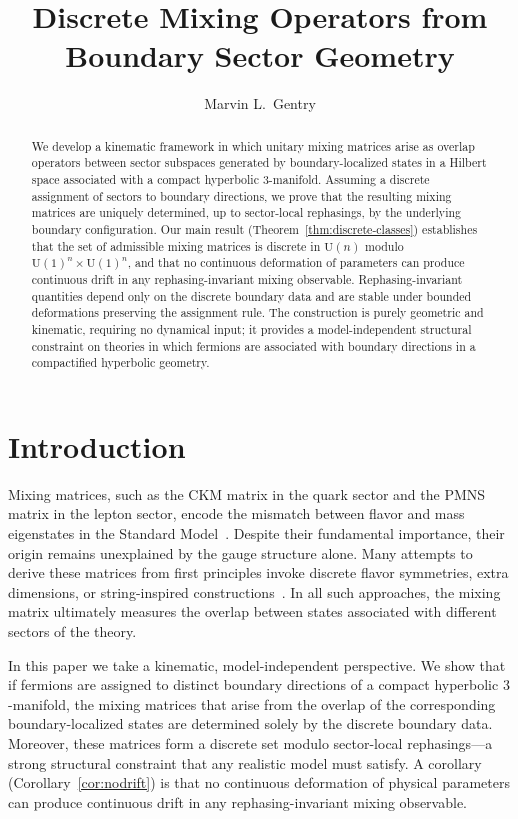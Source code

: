 \documentclass[12pt]{article}
\title{Discrete Mixing Operators from Boundary Sector Geometry}
\date{}
\author[1]{Marvin L.\ Gentry}
\affil[1]{Independent Researcher\\
  \texttt{drmlgentry@protonmail.com}\\
  ORCID: 0009-0006-4550-2663}
\theoremstyle{definition}
\theoremstyle{remark}
\newcommand{\U}{\mathrm{U}}
\begin{document}
\maketitle

\begin{abstract}
We develop a kinematic framework in which unitary mixing matrices arise
as overlap operators between sector subspaces generated by boundary-localized
states in a Hilbert space associated with a compact hyperbolic $3$-manifold.
Assuming a discrete assignment of sectors to boundary directions,
we prove that the resulting mixing matrices are uniquely determined,
up to sector-local rephasings, by the underlying boundary configuration.
Our main result (Theorem~\ref{thm:discrete-classes}) establishes that the
set of admissible mixing matrices is discrete in $\U(n)$ modulo
$\U(1)^n\times\U(1)^n$, and that no continuous deformation of parameters can
produce continuous drift in any rephasing-invariant mixing observable.
Rephasing-invariant quantities depend only on the discrete boundary data
and are stable under bounded deformations preserving the assignment rule.
The construction is purely geometric and kinematic, requiring no dynamical
input; it provides a model-independent structural constraint on theories
in which fermions are associated with boundary directions in a compactified
hyperbolic geometry.
\end{abstract}

\section{Introduction}

Mixing matrices, such as the CKM matrix in the quark sector and the PMNS
matrix in the lepton sector, encode the mismatch between flavor and mass
eigenstates in the Standard Model~\cite{PDGreview}.  Despite their
fundamental importance, their origin remains unexplained by the gauge
structure alone.  Many attempts to derive these matrices from first
principles invoke discrete flavor symmetries, extra dimensions, or
string-inspired constructions~\cite{AltarelliFeruglio,KingLuhn}.  In all
such approaches, the mixing matrix ultimately measures the overlap between
states associated with different sectors of the theory.

In this paper we take a kinematic, model-independent perspective.
We show that if fermions are assigned to distinct boundary directions of a
compact hyperbolic $3$-manifold, the mixing matrices that arise from the
overlap of the corresponding boundary-localized states are determined solely
by the discrete boundary data.  Moreover, these matrices form a discrete
set modulo sector-local rephasings---a strong structural constraint that
any realistic model must satisfy.  A corollary (Corollary~\ref{cor:nodrift})
is that no continuous deformation of physical parameters can produce
continuous drift in any rephasing-invariant mixing observable.
\end{document}

